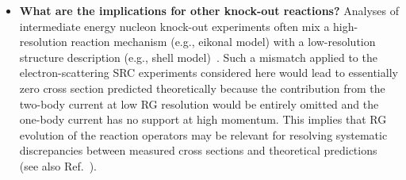 \documentclass[10pt,aps,prc,floatfix,twocolumn,nofootinbib]{revtex4-1}
\begin{document}
\begin{itemize}
  
  
  \item\textbf{What are the implications for other knock-out reactions?}
  Analyses of intermediate energy nucleon knock-out experiments often
 mix a high-resolution reaction mechanism (e.g., eikonal model) with a low-resolution structure description (e.g., shell model)~\cite{Tostevin:2014usa,Aumann:2020tcq}.
  Such a mismatch applied to the electron-scattering SRC experiments considered here would lead to essentially zero cross section predicted theoretically because the contribution from the two-body current at low RG resolution would be entirely omitted and the one-body current has no support at high momentum.
  This implies that RG evolution of the reaction operators may be relevant for resolving systematic discrepancies between measured cross sections and theoretical predictions~\cite{Tostevin:2014usa,Aumann:2020tcq} (see also Ref.~\cite{Wylie:2021uot}).
 

\end{itemize}
\end{document}
